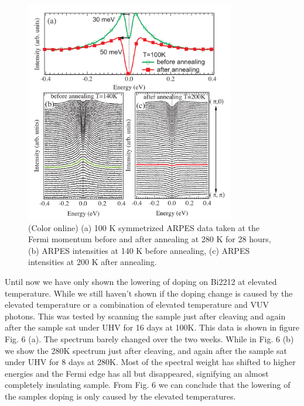 \documentclass[aps,twocolumn,amsmath,amssymb,showpacs,prb,
superscriptaddress,unsortedaddress]{revtex4}
\begin{document}
\begin{figure}
\includegraphics[width=3.6in]{fig5.pdf}
\caption{(Color online)  (a) 100 K symmetrized ARPES data taken at the
Fermi momentum before and after annealing at 280 K for 28 hours, (b)
ARPES intensities at 140 K before annealing, (c) ARPES intensities at
200 K after annealing.}
\label{Fig. 4}
\end{figure}



Until now we have only shown the lowering of doping on Bi2212 at
elevated temperature.  While we still haven't shown if the doping
change is caused by the elevated temperature or a combination of
elevated temperature and VUV photons.  This was tested by scanning the
sample just after cleaving and again after the sample sat under UHV
for 16 days at 100K. This data is shown in figure Fig. 6 (a).  The
spectrum barely changed over the two weeks. While in Fig. 6 (b) we
show the 280K spectrum just after cleaving, and again after the sample
sat under UHV for 8 days at 280K.  Most of the spectral weight has
shifted to higher energies and the Fermi edge has all but disappeared,
signifying an almost completely insulating sample. From Fig. 6 we can
conclude that the lowering of the samples doping is only caused by the
elevated temperatures.
\end{document}
